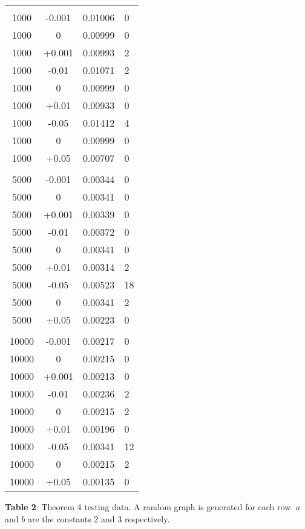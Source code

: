 \documentclass{article}
\begin{document}
\begin{center}
\begin{longtable}{ | c | c | c | L | }
& & & \\

1000 & -0.001 & 0.01006 & 0\\
1000 & 0 & 0.00999 & 0\\
1000 & +0.001 & 0.00993 & 2\\

1000 & -0.01 & 0.01071 & 2\\
1000 & 0 & 0.00999 & 0\\
1000 & +0.01 & 0.00933 & 0\\

1000 & -0.05 & 0.01412 & 4\\
1000 & 0 & 0.00999 & 0\\
1000 & +0.05 & 0.00707 & 0\\

& & & \\

5000 & -0.001 & 0.00344 & 0\\
5000 & 0 & 0.00341 & 0\\
5000 & +0.001 & 0.00339 & 0\\

5000 & -0.01 & 0.00372 & 0\\
5000 & 0 & 0.00341 & 0\\
5000 & +0.01 & 0.00314 & 2\\

5000 & -0.05 & 0.00523 & 18\\
5000 & 0 & 0.00341 & 2\\
5000 & +0.05 & 0.00223 & 0\\

& & & \\

10000 & -0.001 & 0.00217 & 0\\
10000 & 0 & 0.00215 & 0\\
10000 & +0.001 & 0.00213 & 0\\

10000 & -0.01 & 0.00236 & 2\\
10000 & 0 & 0.00215 & 2\\
10000 & +0.01 & 0.00196 & 0\\

10000 & -0.05 & 0.00341 & 12\\
10000 & 0 & 0.00215 & 2\\
10000 & +0.05 & 0.00135 & 0\\

\hline
\end{longtable}
\begin{small}
\textbf{Table 2}: Theorem 4 testing data. A random graph is generated for each row. $a$ and $b$ are the constants 2 and 3 respectively.
\end{small} 
\end{center}
\end{document}
